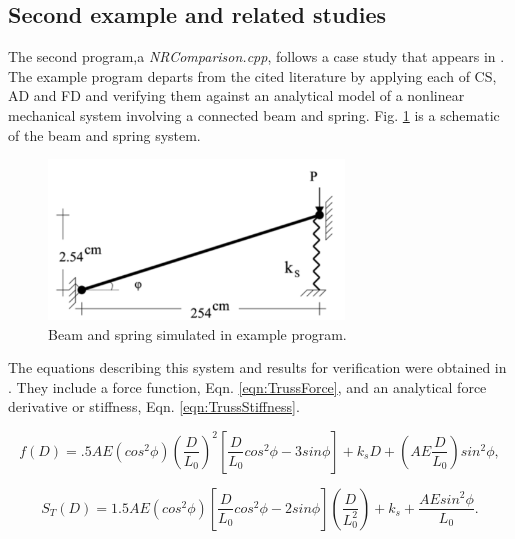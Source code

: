 \documentclass[preprint,12pt]{elsarticle}
\begin{document}
\subsection{Second example and related studies} 
\label{subsec:Validation}
The second program,a \emph{NRComparison.cpp}, follows a case study that appears in
\cite{rezaiee2010dynamic}. The example program departs from the cited
literature by applying each of CS, AD and FD and verifying them against an
analytical model of a nonlinear mechanical system involving a connected beam
and spring. Fig. \ref{fig:TrussSchematic} is a schematic of the beam and spring
system. 

\begin{figure}[tbp] \centering \includegraphics[width=0.7\textwidth]{./figs/truss.png}
\caption{Beam and spring simulated in example program.} \label{fig:TrussSchematic}
\end{figure}

The equations describing this system and results for verification were obtained
in \cite{rezaiee2010dynamic}. They include a force function, Eqn.
\ref{eqn:TrussForce}, and an analytical force derivative or stiffness, Eqn.
\ref{eqn:TrussStiffness}.

\begin{equation} 
    \label{eqn:TrussForce}
    f(D) = .5AE(cos^{2}\phi)(\frac{D}{L_{0}})^{2}[\frac{D}{L_{0}}cos^{2}\phi - 3sin\phi] + k_{s}D + (AE\frac{D}{L_{0}})sin^{2}\phi,
\end{equation} 

\begin{equation} 
    \label{eqn:TrussStiffness}
    S_{T}(D) = 1.5AE(cos^{2}\phi)[\frac{D}{L_{0}}cos^{2}\phi - 2sin\phi](\frac{D}{L_{0}^{2}}) + k_{s} + \frac{AEsin^{2}\phi}{L_{0}}.
\end{equation}
\end{document}
